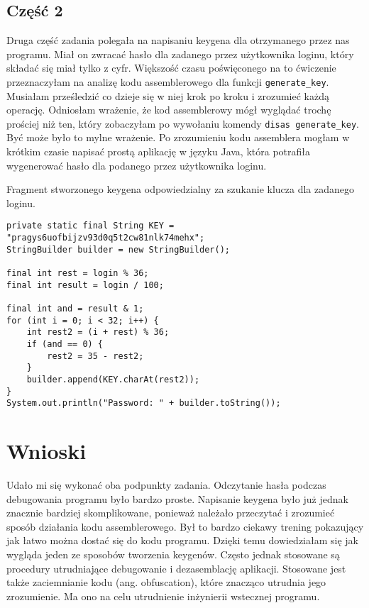 \documentclass[12pt,a4paper,titlepage]{article}
\begin{document}
\subsection{Część 2}
Druga część zadania polegała na napisaniu keygena dla otrzymanego przez nas programu. Miał on zwracać hasło dla zadanego przez użytkownika loginu, który składać się miał tylko z cyfr. Większość czasu poświęconego na to ćwiczenie przeznaczyłam na analizę kodu assemblerowego dla funkcji \texttt{generate_key}. Musiałam prześledzić co dzieje się w niej krok po kroku i zrozumieć każdą operację. Odniosłam wrażenie, że kod assemblerowy mógł wyglądać trochę prościej niż ten, który zobaczyłam po wywołaniu komendy \texttt{disas generate_key}. Być może było to mylne wrażenie. Po zrozumieniu kodu assemblera mogłam w krótkim czasie napisać prostą aplikację w języku Java, która potrafiła wygenerować hasło dla podanego przez użytkownika loginu.

\begin{listing}[H]
\caption{Fragment stworzonego keygena odpowiedzialny za szukanie klucza dla zadanego loginu.}
\begin{verbatim}
private static final String KEY = "pragys6uofbijzv93d0q5t2cw81nlk74mehx";
StringBuilder builder = new StringBuilder();

final int rest = login % 36;
final int result = login / 100;

final int and = result & 1;
for (int i = 0; i < 32; i++) {
    int rest2 = (i + rest) % 36;
    if (and == 0) {
        rest2 = 35 - rest2;
    }
    builder.append(KEY.charAt(rest2));
}
System.out.println("Password: " + builder.toString());

\end{verbatim}
\end{listing}

\section{Wnioski}
Udało mi się wykonać oba podpunkty zadania. Odczytanie hasła podczas debugowania programu było bardzo proste. Napisanie keygena było już jednak znacznie bardziej skomplikowane, ponieważ należało przeczytać i zrozumieć sposób działania kodu assemblerowego. Był to bardzo ciekawy trening pokazujący jak łatwo można dostać się do kodu programu. Dzięki temu dowiedziałam się jak wygląda jeden ze sposobów tworzenia keygenów. Często jednak stosowane są procedury utrudniające debugowanie i dezasemblację aplikacji. Stosowane jest także zaciemnianie kodu (ang. obfuscation), które znacząco utrudnia jego zrozumienie. Ma ono na celu utrudnienie inżynierii wstecznej programu.

\listoflistings
\end{document}
